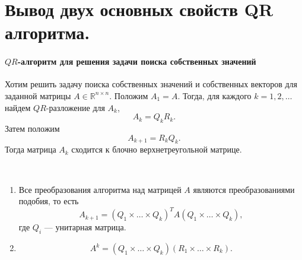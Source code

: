 \section{Вывод двух основных свойств QR алгоритма.}

\paragraph{$QR$-алгоритм для решения задачи поиска собственных значений}

Хотим решить задачу поиска собственных значений и собственных векторов для заданной матрицы $A \in \mathbb{R}^{n \times n}$.
Положим $A_{1} = A$.
Тогда, для каждого $k = 1, 2, \dots$ найдем $QR$-разложение для $A_{k}$,
\begin{equation} \label{q07::eq::1}
    A_{k} = Q_{k} R_{k}.
\end{equation}
Затем положим
\begin{equation} \label{q07::eq::2}
    A_{k + 1} = R_{k} Q_{k}.
\end{equation}
Тогда матрица $A_{k}$ сходится к блочно верхнетреугольной матрице.

\begin{properties}~
    \begin{enumerate}
        \item Все преобразования алгоритма над матрицей $A$ являются преобразованиями подобия, то есть
              \[
                  A_{k + 1} = (Q_{1} \times \ldots \times Q_{k})^{T} A (Q_{1} \times \ldots \times Q_{k}),
              \]
              где $Q_{i}$ --- унитарная матрица.
        \item
              \[
                  A^{k} = (Q_{1} \times \ldots \times Q_{k}) (R_{1} \times \ldots \times R_{k}).
              \]
    \end{enumerate}
\end{properties}

